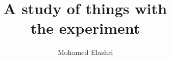 \documentclass[hyperpdf,bindnopdf]{hepthesis}
\title{A study of things with\\ the \nova experiment}
\author{Mohamed Elashri}
\begin{document}
\begin{frontmatter}
  
\end{frontmatter}



\begin{mainmatter}
  
  
  
\end{mainmatter}

\begin{backmatter}
  
\end{backmatter}


\begin{appendices}
  
\end{appendices}


\end{document}
